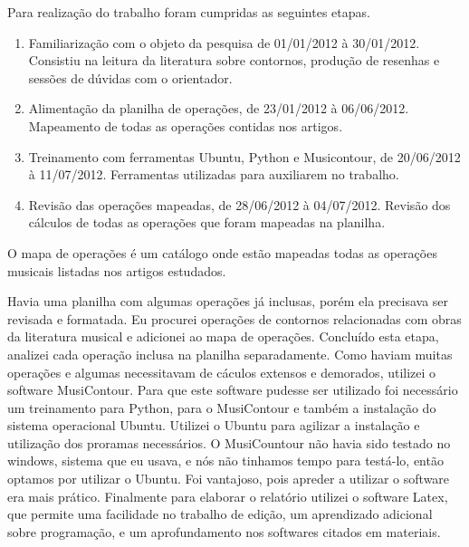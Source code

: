 \documentclass[11pt]{article}
\begin{document}
 Para realização do trabalho foram cumpridas as seguintes etapas.

\begin{enumerate}
\item Familiarização com o objeto da pesquisa de 01/01/2012 à 30/01/2012. 
Consistiu na leitura da literatura sobre contornos, produção de resenhas 
e sessões de dúvidas com o orientador. 
\item Alimentação da planilha de operações, de 23/01/2012 à 06/06/2012. 
Mapeamento de todas as operações contidas nos artigos. 
\item Treinamento com ferramentas Ubuntu, Python e Musicontour, de 20/06/2012 à 11/07/2012. 
Ferramentas utilizadas para auxiliarem no trabalho. 
\item Revisão das operações mapeadas, de 28/06/2012 à 04/07/2012. 
Revisão dos cálculos de todas as operações que foram mapeadas na planilha.
\end{enumerate}

O mapa de operações é um catálogo onde estão mapeadas todas as
operações musicais listadas nos artigos estudados.

Havia uma planilha com algumas operações já inclusas, porém ela
precisava ser revisada e formatada.
Eu procurei operações de contornos relacionadas com obras da literatura
musical e adicionei ao mapa de operações.
Concluído esta etapa, analizei cada operação inclusa na
planilha separadamente. Como haviam muitas operações e algumas
necessitavam de cáculos extensos e demorados, utilizei o software
MusiContour. Para que este software pudesse ser utilizado foi
necessário um treinamento para Python, para o MusiContour e também a
instalação do sistema operacional Ubuntu.
Utilizei o Ubuntu para agilizar a instalação e utilização dos proramas
necessários. O MusiCountour não havia sido testado no windows, sistema 
que eu usava, e nós não tinhamos tempo para testá-lo, então optamos por 
utilizar o Ubuntu. Foi vantajoso, pois apreder a utilizar o software
era mais prático.
Finalmente para elaborar o relatório utilizei o software Latex, que
permite uma facilidade no trabalho de edição, um aprendizado adicional
sobre programação, e um aprofundamento nos softwares citados em
materiais.
\end{document}
